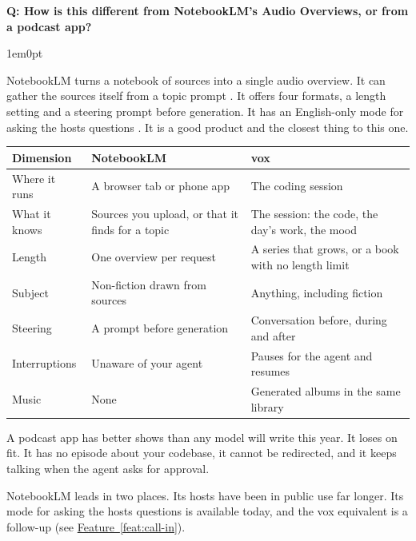 \documentclass[11pt,letterpaper]{article} %
\newcounter{faqnum} %
\newenvironment{faqpair}[1]{%
  \needspace{4\baselineskip}%
  \vspace{0.5em}%
  \refstepcounter{faqnum}%
  \noindent\textbf{\color{SectionBlue}Q\thefaqnum: #1}\par\nopagebreak[4]%
  \vspace{0.2em}%
  \begin{adjustwidth}{1em}{0pt}%
  \setlength{\parindent}{0pt}%
  \setlength{\parskip}{0.5em}%
}{%
  \end{adjustwidth}%
  \vspace{0.5em}%
}
\newcommand{\featureref}[1]{\hyperref[#1]{Feature~\ref*{#1}}}
\begin{document}
\begin{faqpair}{How is this different from NotebookLM's Audio Overviews, or from a podcast app?}\label{faq:different}

  NotebookLM turns a notebook of sources into a single audio overview. It
  can gather the sources itself from a topic prompt
  \cite{google2025deepresearch}. It offers four formats, a length setting and a steering prompt
  before generation. It has an English-only mode for asking the hosts
  questions \cite{notebooklm2026audiooverview,techcrunch2025notebooklmtone}.
  It is a good product and the closest thing to this one.

  \begin{center} %
  \small
  \renewcommand{\arraystretch}{1.3}
  \begin{tabularx}{\linewidth}{@{} l X X @{}}
  \toprule
  \textbf{\color{SectionBlue}Dimension} & \textbf{\color{SectionBlue}NotebookLM} & \textbf{\color{SectionBlue}vox} \\
  \midrule
  Where it runs & A browser tab or phone app & The coding session \\
  What it knows & Sources you upload, or that it finds for a topic & The session: the code, the day's work, the mood \\
  Length & One overview per request & A series that grows, or a book with no length limit \\
  Subject & Non-fiction drawn from sources & Anything, including fiction \\
  Steering & A prompt before generation & Conversation before, during and after \\
  Interruptions & Unaware of your agent & Pauses for the agent and resumes \\
  Music & None & Generated albums in the same library \\
  \bottomrule
  \end{tabularx}
  \renewcommand{\arraystretch}{1.0}
  \end{center}

  A podcast app has better shows than any model will write this year. It
  loses on fit. It has no episode about your codebase, it cannot be
  redirected, and it keeps talking when the agent asks for approval.

  NotebookLM leads in two places. Its hosts have been in public use far
  longer. Its mode for asking the hosts questions is available today,
  and the vox equivalent is a follow-up (see \featureref{feat:call-in}).
\end{faqpair}
\end{document}
